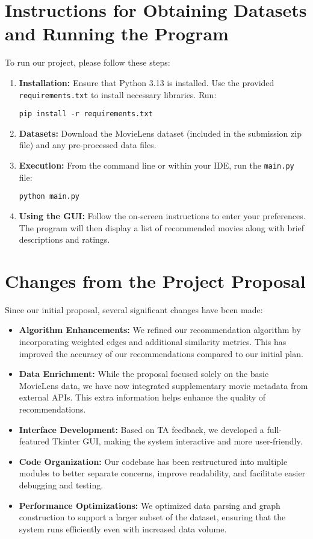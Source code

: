 \documentclass[12pt]{article}
\begin{document}
\section{Instructions for Obtaining Datasets and Running the Program}
To run our project, please follow these steps:
\begin{enumerate}
    \item \textbf{Installation:} Ensure that Python 3.13 is installed. Use the provided \texttt{requirements.txt} to install necessary libraries. Run:
    \begin{verbatim}
pip install -r requirements.txt
    \end{verbatim}
    \item \textbf{Datasets:} Download the MovieLens dataset (included in the submission zip file) and any pre-processed data files.
    \item \textbf{Execution:} From the command line or within your IDE, run the \texttt{main.py} file:
    \begin{verbatim}
python main.py
    \end{verbatim}
    \item \textbf{Using the GUI:} Follow the on-screen instructions to enter your preferences. The program will then display a list of recommended movies along with brief descriptions and ratings.
\end{enumerate}

\section{Changes from the Project Proposal}
Since our initial proposal, several significant changes have been made:
\begin{itemize}
    \item \textbf{Algorithm Enhancements:} We refined our recommendation algorithm by incorporating weighted edges and additional similarity metrics. This has improved the accuracy of our recommendations compared to our initial plan.
    \item \textbf{Data Enrichment:} While the proposal focused solely on the basic MovieLens data, we have now integrated supplementary movie metadata from external APIs. This extra information helps enhance the quality of recommendations.
    \item \textbf{Interface Development:} Based on TA feedback, we developed a full-featured Tkinter GUI, making the system interactive and more user-friendly.
    \item \textbf{Code Organization:} Our codebase has been restructured into multiple modules to better separate concerns, improve readability, and facilitate easier debugging and testing.
    \item \textbf{Performance Optimizations:} We optimized data parsing and graph construction to support a larger subset of the dataset, ensuring that the system runs efficiently even with increased data volume.
\end{itemize}
\end{document}
